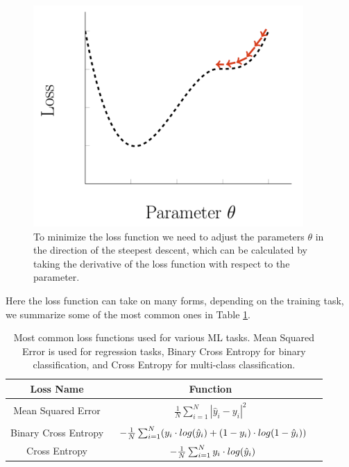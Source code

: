 \begin{figure}[h]
    \includegraphics[width=\linewidth]{chapters/NLP/figures/loss.png}
    \caption{To minimize the loss function we need to adjust the parameters $\theta$ in the direction of the steepest descent, which can be calculated by taking the derivative of the loss function with respect to the parameter.}
    \label{fig:loss}
\end{figure}
Here the loss function can take on many forms, depending on the training task, we summarize some of the most common ones in Table \ref{table:losses}.
\begin{table}
    \centering
    \renewcommand{\arraystretch}{1.3}
    \begin{tabular}{|c| c| c|}
    Loss Name & Function \\[0.5ex] \hline
    Mean Squared Error & $\begin{array} {lcl} \frac{1}{N} \sum_{i=1}^N|\hat{y}_i - y_i|^2\end{array}$  \\ [0.5ex]
    Binary Cross Entropy & $\begin{array} {r@{}l@{}} -\frac{1}{N} \sum_{i=1}^N (y_i \cdot log(\hat{y}_i) + (1 - y_i) \cdot log(1-\hat{y}_i)) \end{array}$ \\ [0.5ex]
    Cross Entropy & $\begin{array} {r@{}l@{}} -\frac{1}{N} \sum_{i=1}^N y_i \cdot log(\hat{y}_i) \end{array}$ \\ [0.5ex]
    \end{tabular}
    \caption{Most common loss functions used for various ML tasks. Mean Squared Error is used for regression tasks, Binary Cross Entropy for binary classification, and Cross Entropy for multi-class classification.}
    \label{table:losses}
\end{table}
